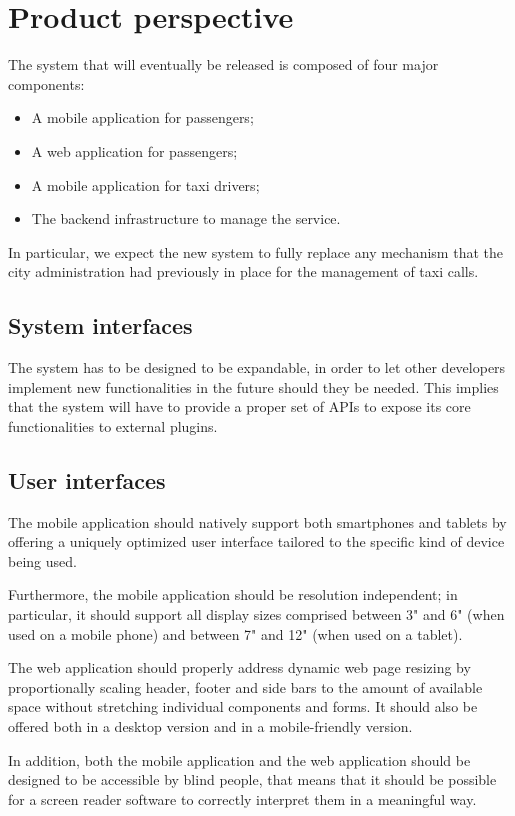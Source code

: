 \section{Product perspective}
The system that will eventually be released is composed of four major components:
\begin{itemize}
\item A mobile application for passengers;
\item A web application for passengers;
\item A mobile application for taxi drivers;
\item The backend infrastructure to manage the service.
\end{itemize}
In particular, we expect the new system to fully replace any mechanism that the city administration had previously in place for the management of taxi calls.


\subsection{System interfaces}
The system has to be designed to be expandable, in order to let other developers implement new functionalities in the future should they be needed. This implies that the system will have to provide a proper set of APIs to expose its core functionalities to external plugins. 


\subsection{User interfaces}
The mobile application should natively support both smartphones and tablets by offering a uniquely optimized user interface tailored to the specific kind of device being used. 

Furthermore, the mobile application should be resolution independent; in particular, it should support all display sizes comprised between 3" and 6" (when used on a mobile phone) and between 7" and 12" (when used on a tablet).

The web application should properly address dynamic web page resizing by proportionally scaling header, footer and side bars to the amount of available space without stretching individual components and forms. It should also be offered both in a desktop version and in a mobile-friendly version.

In addition, both the mobile application and the web application should be designed to be accessible by blind people, that means that it should be possible for a screen reader software to correctly interpret them in a meaningful way.


